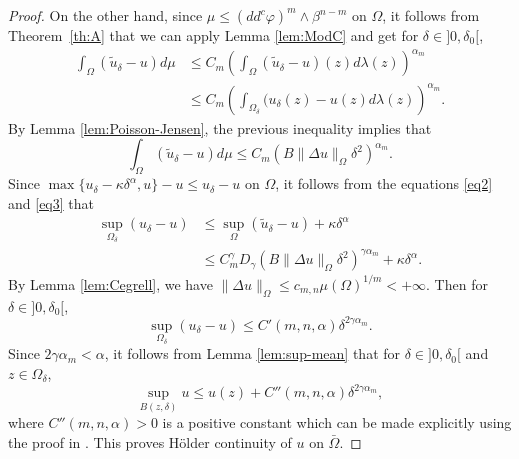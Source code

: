 \documentclass[JEP,XML,SOM,Unicode]{cedram}
\theoremstyle{definition}
\begin{document}
\begin{proof}
On the other hand, since $\mu\leq (dd^c\varphi)^m\wedge\beta^{n-m}$ on $\Omega$, it follows from Theorem~\ref{th:A} that we can apply Lemma \ref{lem:ModC} and get for $\delta\in{}]0,\delta_0[$,
\begin{align*}
\int_{\Omega}(\tilde{u}_{\delta}-u)d\mu & \leq C_m \left(\int_{\Omega}(\tilde{u}_{\delta}-u)(z)d\lambda(z)\right)^{\alpha_m} \nonumber \\
&\leq C_m\left(\int_{\Omega_{\delta}}({u}_{\delta}(z)-u(z)d\lambda(z)\right)^{\alpha_m}.
\end{align*}
By Lemma \ref{lem:Poisson-Jensen}, the previous inequality implies that
\begin{equation} \label{eq3}
\int_{\Omega}(\tilde{u}_{\delta}-u)d\mu \leq C_m(B \|\Delta u\|_{\Omega}\delta^2)^{\alpha_m}.
\end{equation}
Since $ \max \{{u}_{\delta}- \kappa \delta^{\alpha},u\}-u\leq {u}_{\delta}-u$ on $\Omega$, it follows from the equations \eqref{eq2} and \eqref{eq3} that
\begin{align*}
\sup_{\Omega_{\delta}}( {u}_{\delta}-u)&\leq\sup_{\Omega}(\tilde{u}_{\delta}-u)+ \kappa \delta^{\alpha} \\
&\leq C_m^{\gamma} D_\gamma \left(B\|\Delta u\|_{\Omega}\delta^2\right)^{\gamma\alpha_m} + \kappa \delta^{\alpha}.
\end{align*}
By Lemma \ref{lem:Cegrell}, we have $\|\Delta u\|_{\Omega} \leq c_{m,n} \mu (\Omega)^{1 \slash m} < + \infty$. Then for $\delta\in{}]0,\delta_0[$,
\[
\sup_{\Omega_{\delta}}({u}_{\delta}-u)\leq C' (m,n,\alpha) \delta^{2 \gamma \alpha_m}.
\]
Since $2 \gamma \alpha_m < \alpha$, it follows from Lemma \ref{lem:sup-mean} that for $\delta\in{}]0,\delta_0[$ and $z \in \Omega_\delta$,
\[
\sup_{B (z,\delta)} u \leq u (z) + C'' (m,n,\alpha) \delta^{2 \gamma \alpha_m},
\]
where $C''(m,n,\alpha) > 0$ is a positive constant which can be made explicitly using the proof in \cite{GKZ08}.
This proves Hölder continuity of $u$ on $\bar \Omega$.
\end{proof}

\backmatter


\end{document}
